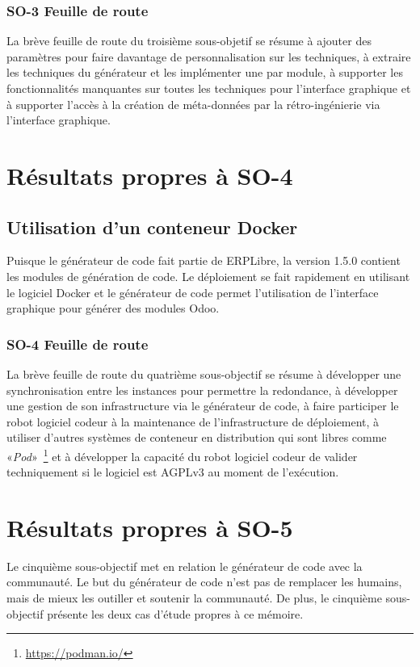\subsubsection{SO-3 Feuille de route}
La brève feuille de route du troisième sous-objetif se résume à ajouter des paramètres pour faire davantage de personnalisation sur les techniques, à extraire les techniques du générateur et les implémenter une par module, à supporter les fonctionnalités manquantes sur toutes les techniques pour l’interface graphique et à supporter l’accès à la création de méta-données par la rétro-ingénierie via l’interface graphique.

\section{Résultats propres à SO-4}

\subsection{Utilisation d’un conteneur Docker}

Puisque le générateur de code fait partie de ERPLibre, la version 1.5.0 contient les modules de génération de code. Le déploiement se fait rapidement en utilisant le logiciel Docker et le générateur de code permet l’utilisation de l’interface graphique pour générer des modules Odoo.

\subsubsection{SO-4 Feuille de route}
La brève feuille de route du quatrième sous-objectif se résume à développer une synchronisation entre les instances pour permettre la redondance, à développer une gestion de son infrastructure via le générateur de code, à faire participer le robot logiciel codeur à la maintenance de l’infrastructure de déploiement, à utiliser d’autres systèmes de conteneur en distribution qui sont libres comme «\textit{Pod}»~\footnote{\url{https://podman.io/}} et à développer la capacité du robot logiciel codeur de valider techniquement si le logiciel est AGPLv3 au moment de l’exécution.

\section{Résultats propres à SO-5}
Le cinquième sous-objectif met en relation le générateur de code avec la communauté. Le but du générateur de code n'est pas de remplacer les humains, mais de mieux les outiller et soutenir la communauté. De plus, le cinquième sous-objectif présente les deux cas d'étude propres à ce mémoire.
